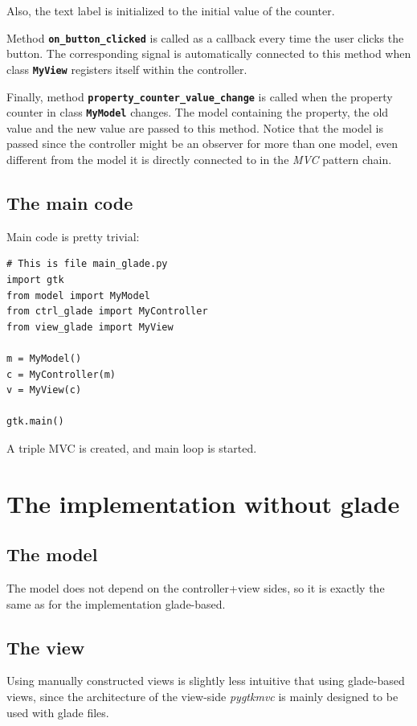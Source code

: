 \documentclass{article}
\newcommand{\kw}[1]{\emph{#1}\xspace}
\newcommand{\mvc}{\kw{MVC} pattern\xspace}
\newcommand{\pygtkmvc}{\kw{pygtkmvc}}
\newcommand{\codename}[1]{\texttt{\bfseries \textcolor {codecolor}{#1}}\xspace}
\newcommand{\codesize}{\small } %
\begin{document}
Also, the text label is initialized to the initial value of the
counter.

Method \codename{on\_button\_clicked} is called as a callback every
time the user clicks the button. The corresponding signal is
automatically connected to this method when class \codename{MyView}
registers itself within the controller.

Finally, method \codename{property\_counter\_value\_change} is
called when the property counter in class \codename{MyModel}
changes. The model containing the property, the old value and the
new value are passed to this method. Notice that the model is passed
since the controller might be an observer for more than one model,
even different from the model it is directly connected to in the
\mvc chain.


\subsection{The main code}
Main code is pretty trivial:
  
{ \codesize 
\begin{verbatim}   
# This is file main_glade.py
import gtk
from model import MyModel
from ctrl_glade import MyController
from view_glade import MyView

m = MyModel()
c = MyController(m)
v = MyView(c)

gtk.main()
\end{verbatim}
} 

A triple MVC is created, and main loop is started. 


\section{The implementation without glade}

\subsection{The model}
The model does not depend on the controller+view sides, so it is
exactly the same as for the implementation glade-based.

\subsection{The view}
Using manually constructed views is slightly less intuitive that using
glade-based views, since the architecture of the view-side \pygtkmvc
is mainly designed to be used with glade files.
\end{document}
